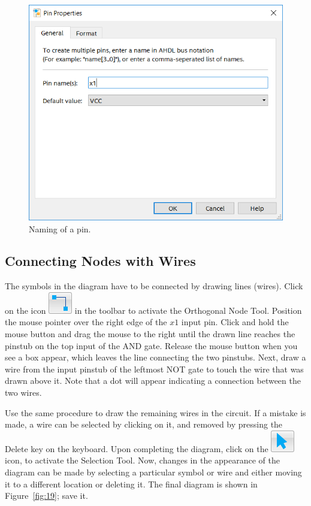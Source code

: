 \documentclass[11pt, twoside, pdftex]{article}
\begin{document}
\begin{figure}[H]
   \begin{center}
      \includegraphics[scale=0.60]{figures/figure18.png}
   \caption{Naming of a pin.} 
	 \label{fig:18}
	 \end{center}
\end{figure}

\subsection{Connecting Nodes with Wires}

The symbols in the diagram have to be connected by drawing lines (wires).
Click on the icon \includegraphics[scale=0.45]{figures/icon3.png} in the toolbar
to activate the Orthogonal Node Tool.
Position the mouse pointer over the right edge of the $x1$ input pin.
Click and hold the mouse button and drag the mouse to the right until the drawn
line reaches the pinstub on the top input of the AND gate. Release the mouse button when you see a box appear,
which leaves the line connecting the two pinstubs. Next, draw a wire from the input
pinstub of the leftmost NOT gate to touch the wire that was drawn above it. 
Note that a dot will appear indicating a connection between the two wires.

Use the same procedure to draw the remaining wires in the circuit. If a mistake is made,
a wire can be selected by clicking on it, and
removed by pressing the Delete key on the keyboard. Upon completing
the diagram, click on the \includegraphics[scale=0.45]{figures/icon4.png} icon, to activate the Selection
Tool. Now, changes in the appearance of the diagram can be made by
selecting a particular symbol or wire and either moving it to a different location or
deleting it. The final diagram is shown in Figure~\ref{fig:19}; save it.
\end{document}
